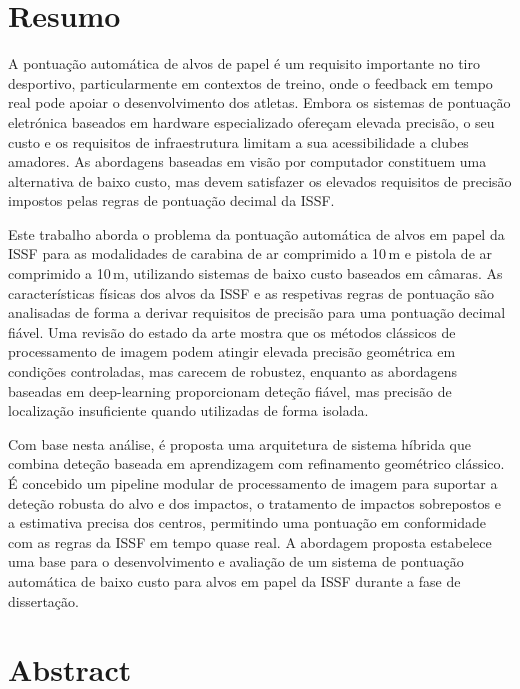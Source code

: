 
\chapter*{Resumo}

A pontuação automática de alvos de papel é um requisito importante no tiro desportivo,
particularmente em contextos de treino, onde o feedback em tempo real pode apoiar o
desenvolvimento dos atletas. Embora os sistemas de pontuação eletrónica baseados em hardware
especializado ofereçam elevada precisão, o seu custo e os requisitos de infraestrutura limitam a
sua acessibilidade a clubes amadores. As abordagens baseadas em visão por computador
constituem uma alternativa de baixo custo, mas devem satisfazer os elevados requisitos de
precisão impostos pelas regras de pontuação decimal da ISSF.

Este trabalho aborda o problema da pontuação automática de alvos em papel da ISSF para as
modalidades de carabina de ar comprimido a 10\,m e pistola de ar comprimido a 10\,m, utilizando
sistemas de baixo custo baseados em câmaras. As características físicas dos alvos da ISSF e as
respetivas regras de pontuação são analisadas de forma a derivar requisitos de precisão para uma
pontuação decimal fiável. Uma revisão do estado da arte mostra que os métodos clássicos de
processamento de imagem podem atingir elevada precisão geométrica em condições controladas,
mas carecem de robustez, enquanto as abordagens baseadas em deep-learning
proporcionam deteção fiável, mas precisão de localização insuficiente quando utilizadas de forma
isolada.

Com base nesta análise, é proposta uma arquitetura de sistema híbrida que combina deteção
baseada em aprendizagem com refinamento geométrico clássico. É concebido um pipeline modular
de processamento de imagem para suportar a deteção robusta do alvo e dos impactos, o tratamento
de impactos sobrepostos e a estimativa precisa dos centros, permitindo uma pontuação em
conformidade com as regras da ISSF em tempo quase real. A abordagem proposta estabelece uma
base para o desenvolvimento e avaliação de um sistema de pontuação automática de baixo custo
para alvos em papel da ISSF durante a fase de dissertação.

\chapter*{Abstract}

